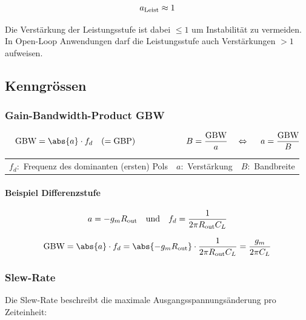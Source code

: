 \[
    a_{\rm Leist} \approx 1
\]

Die Verstärkung der Leistungsstufe ist dabei $\leq 1$ um Instabilität zu vermeiden. \\
In Open-Loop Anwendungen darf die Leistungsstufe auch Verstärkungen $>1$ aufweisen.


\subsection{Kenngrössen}

\subsubsection{Gain-Bandwidth-Product GBW}
\vspace{-0.2cm}

\[
    \text{GBW} = \abs{a} \cdot  f_d \quad (= \text{GBP}) 
    \qquad \qquad \qquad
    B = \frac{\text{GBW}}{a} \quad \Leftrightarrow\ \quad a = \frac{\text{GBW}}{B}  %
\]


\begin{tabular}{l | l | l}
    $f_d:$ Frequenz des dominanten (ersten) Pols    & $a:$ Verstärkung   & $B:$ Bandbreite           
\end{tabular}





\paragraph{Beispiel Differenzstufe}
\[
    a = -g_m R_{\rm out} \quad \text{und} \quad f_d = \frac{1}{2 \pi R_{\rm out} C_L}
\]
\begin{center}
    \textdownarrow
\end{center}
\[
    \text{GBW} = \abs{a} \cdot f_d = \abs{-g_m R_{\rm out}} \cdot \frac{1}{2 \pi R_{\rm out} C_L} = \frac{g_m}{2 \pi C_L}
\]

\subsubsection{Slew-Rate}
Die Slew-Rate beschreibt die maximale Ausgangsspannungsänderung pro Zeiteinheit:

